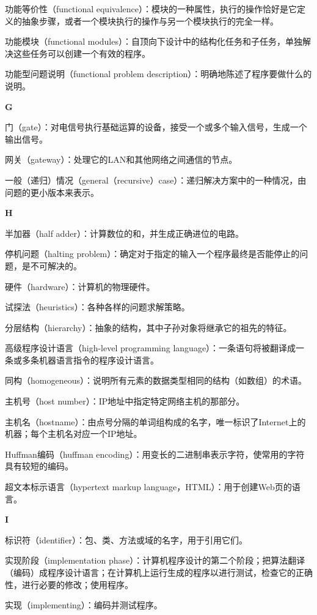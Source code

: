 功能等价性（functional equivalence）：模块的一种属性，执行的操作恰好是它定义的抽象步骤，或者一个模块执行的操作与另一个模块执行的完全一样。

功能模块（functional modules）：自顶向下设计中的结构化任务和子任务，单独解决这些任务可以创建一个有效的程序。

功能型问题说明（functional problem description）：明确地陈述了程序要做什么的说明。

\textbf{G}

门（gate）：对电信号执行基础运算的设备，接受一个或多个输入信号，生成一个输出信号。

网关（gateway）：处理它的LAN和其他网络之间通信的节点。

一般（递归）情况（general（recursive）case）：递归解决方案中的一种情况，由问题的更小版本来表示。

\textbf{H}

半加器（half adder）：计算数位的和，并生成正确进位的电路。

停机问题（halting problem）：确定对于指定的输入一个程序最终是否能停止的问题，是不可解决的。

硬件（hardware）：计算机的物理硬件。

试探法（heuristics）：各种各样的问题求解策略。

分层结构（hierarchy）：抽象的结构，其中子孙对象将继承它的祖先的特征。

高级程序设计语言（high-level programming language）：一条语句将被翻译成一条或多条机器语言指令的程序设计语言。

同构（homogeneous）：说明所有元素的数据类型相同的结构（如数组）的术语。

主机号（host number）：IP地址中指定特定网络主机的那部分。

主机名（hostname）：由点号分隔的单词组构成的名字，唯一标识了Internet上的机器；每个主机名对应一个IP地址。

Huffman编码（huffman encoding）：用变长的二进制串表示字符，使常用的字符具有较短的编码。

超文本标示语言（hypertext markup language，HTML）：用于创建Web页的语言。

\textbf{I}

标识符（identifier）：包、类、方法或域的名字，用于引用它们。

实现阶段（implementation phase）：计算机程序设计的第二个阶段；把算法翻译（编码）成程序设计语言；在计算机上运行生成的程序以进行测试，检查它的正确性，进行必要的修改；使用程序。

实现（implementing）：编码并测试程序。

